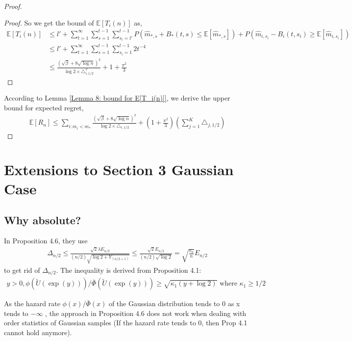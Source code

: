 \documentclass{article}
\theoremstyle{plain}
\begin{document}
\begin{proof}
\begin{proof}
    So we get the bound of $\mathbb{E}[T_i(n)]$ as,
    \begin{align}
        \mathbb{E}[T_i(n)] &\leq l' + \sum_{t = 1}^\infty \sum_{s = 1}^{t-1} \sum_{s_i = l'}^{t-1} P(\hat{m}_{*, s} + B_*(t, s) \leq  \mathbb{E}[\hat{m}_{*, s}]) + P(\hat{m}_{i, s_i} - B_i(t, s_i) \geq \mathbb{E}[\hat{m}_{i, s_i}])\\
        & \leq l' + \sum_{t = 1}^\infty \sum_{s = 1}^{t-1} \sum_{s_i = 1}^{t-1} 2 t^{-4}\\
        & \leq \frac{(\sqrt{\beta} + 8 \sqrt{\log n})^2}{\log 2 \times \triangle_{i, 1/2}^2} + 1 + \frac{\pi^2}{3}
    \end{align}
   
\end{proof}

According to Lemma \ref{Lemma 8: bound for E[T_i(n)]}, we derive the upper bound for expected regret,
\begin{align}
    \mathbb{E}[R_n] \leq 
          \sum_{i: m_i < m_\ast} \frac{(\sqrt{\beta} + 8 \sqrt{\log n})^2}{\log 2 \times \triangle_{i, 1/2}} + (1 + \frac{\pi^2}{3}) (\sum_{j=1}^K \triangle_{j, 1/2}) 
\end{align}
   
\end{proof}


\section{Extensions to Section 3 Gaussian Case}

\subsection{Why absolute?}

In \cite{boucheron2012} Proposition 4.6,  they use
\begin{align}
    \Delta_{n / 2} \leq \frac{\sqrt{2} \lambda E_{n / 2}}{(n / 2) \sqrt{\log 2+Y_{(n / 2+1)}}} \leq \frac{\sqrt{2} E_{n / 2}}{(n / 2) \sqrt{\log 2}}=\sqrt{\frac{v_{n}}{n}} E_{n / 2}
\end{align}
to get rid of $\Delta_{n/2}$. 
The inequality is derived from \cite{boucheron2012} Proposition 4.1: 
\begin{align}
    y>0, \phi(\tilde{U}(\exp (y))) / \bar{\Phi}(\tilde{U}(\exp (y))) \geq \sqrt{\kappa_{1}(y+\log 2)} \text { where } \kappa_{1} \geq 1 / 2
\end{align} 

As the hazard rate $\phi(x) / \bar{\Phi}(x)$ of the Gaussian distribution tends to 0 as x tends to $- \infty$ , the approach in  \cite{boucheron2012} Proposition 4.6 does not work when dealing with order statistics of Gaussian samples (If the hazard rate tends to 0, then Prop 4.1 cannot hold anymore).
\end{document}
